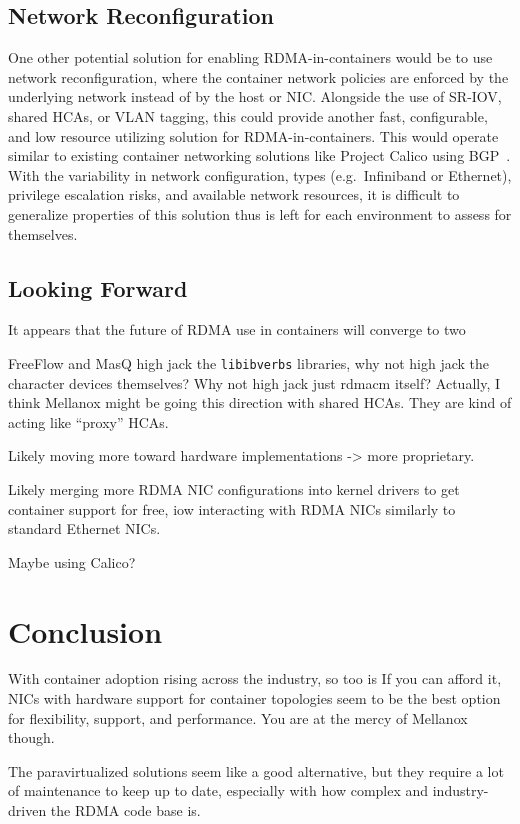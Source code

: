 \documentclass[12pt,titlepage]{article}
\begin{document}
\subsection{Network Reconfiguration}
One other potential solution for enabling RDMA-in-containers would be to use network reconfiguration, where the container network policies are enforced by the underlying network instead of by the host or NIC.
Alongside the use of SR-IOV, shared HCAs, or VLAN tagging, this could provide another fast, configurable, and low resource utilizing solution for RDMA-in-containers.
This would operate similar to existing container networking solutions like Project Calico using BGP~\cite{caliconetwork}.
With the variability in network configuration, types (e.g.\ Infiniband or Ethernet), privilege escalation risks, and available network resources, it is difficult to generalize properties of this solution thus is left for each environment to assess for themselves.

\subsection{Looking Forward}
It appears that the future of RDMA use in containers will converge to two 

FreeFlow and MasQ high jack the \texttt{libibverbs} libraries, why not high jack the character devices themselves?
Why not high jack just rdmacm itself?
Actually, I think Mellanox might be going this direction with shared HCAs.
They are kind of acting like ``proxy'' HCAs.

Likely moving more toward hardware implementations -> more proprietary.

Likely merging more RDMA NIC configurations into kernel drivers to get container support for free, iow interacting with RDMA NICs similarly to standard Ethernet NICs.

Maybe using Calico?

\section{Conclusion}
With container adoption rising across the industry, so too is 
If you can afford it, NICs with hardware support for container topologies seem to be the best option for flexibility, support, and performance.
You are at the mercy of Mellanox though.

The paravirtualized solutions seem like a good alternative, but they require a lot of maintenance to keep up to date, especially with how complex and industry-driven the RDMA code base is.
\end{document}
